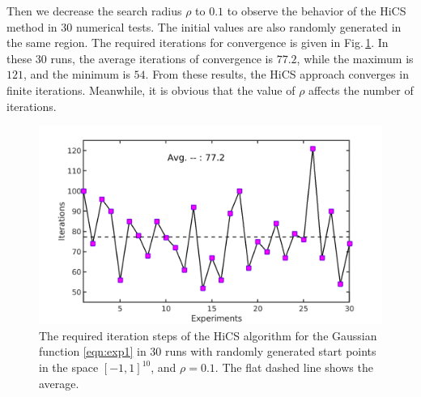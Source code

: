 \documentclass[final,1p,times]{elsarticle}
\begin{document}
Then we decrease the search radius $\rho$ to $0.1$ to observe the
behavior of the HiCS method in $30$ numerical tests. 
The initial values are also randomly generated in the same region.  
The required iterations for convergence is given in
Fig.\,\ref{fig:exp1:randInitr0_1}.
In these $30$ runs, the average iterations of convergence is
$77.2$, while the maximum is $121$, and the minimum is $54$.
From these results, the HiCS approach converges in
finite iterations. Meanwhile, it is obvious that the value of
$\rho$ affects the number of iterations. 
\begin{figure}[!htbp]
	\centering
	  \includegraphics[scale=0.2]{../figures/gauss10Drandr0_1.png}
	  \caption{
	  The required iteration steps of the 
	  HiCS algorithm for the Gaussian function
	  \eqref{eqn:exp1} in $30$ runs with randomly generated start points
	  in the space $[-1, 1]^{10}$, and $\rho=0.1$. 
	  The flat dashed line shows the average.} 
	  \label{fig:exp1:randInitr0_1}
\end{figure}


\end{document}
